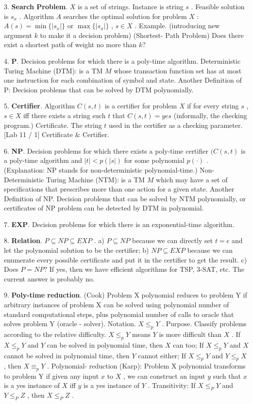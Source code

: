 \documentclass[10pt,a4paper]{article}
\begin{document}
3. \textbf{Search Problem}. \(X\) is a set of strings. Instance is string \(s\) . Feasible solution is \(s_{x}\) . Algorithm \(A\) searches the optimal solution for problem \(X\) : \(A(s) = \min \{|s_{x}|\}\) or \(\max \{|s_{x}|\}\) , \(s\in X\) .
Example. (introducing new argument \(k\) to make it a decision problem)
(Shortest- Path Problem) Does there exist a shortest path of weight no more than \(k?\)

4. \textbf{P}. Decision problems for which there is a poly-time algorithm.
Deterministic Turing Machine (DTM): is a TM \(M\) whose transaction function set has at most one instruction for each combination of symbol and state.
Another Definition of P: Decision problems that can be solved by DTM polynomially.

5. \textbf{Certifier}. Algorithm \(C(s,t)\) is a certifier for problem \(X\) if for every string \(s\) , \(s\in X\) iff there exists a string such \(t\) that \(C(s,t) = yes\) (informally, the checking program.)
Certificate. The string \(t\) used in the certifier as a checking parameter.
[Lab 11 / 1] Certificate \& Certifier.

6. \textbf{NP}. Decision problems for which there exists a poly-time certifier \((C(s,t)\) is a poly-time algorithm and \(|t|< p(|s|)\) for some polynomial \(p(\cdot)\) . (Explanation: NP stands for non-deterministic polynomial-time.)
Non-Deterministic Turing Machine (NTM): is a TM \(M\) which may have a set of specifications that prescribes more than one action for a given state.
Another Definition of NP. Decision problems that can be solved by NTM polynomially, or certificates of NP problem can be detected by DTM in polynomial.

7. \textbf{EXP}. Decision problems for which there is an exponential-time algorithm.

8. \textbf{Relation}. \(P\subseteq NP\subseteq EXP\) .
a) \(P\subseteq NP\) because we can directly set \(t = \epsilon\) and let the polynomial solution to be the certifier;
b) \(NP\subseteq EXP\) because we can enumerate every possible certificate and put it in the certifier to get the result.
c) Does \(P = NP?\) If yes, then we have efficient algorithms for TSP, 3-SAT, etc. The current answer is probably no.

9. \textbf{Poly-time reduction}. (Cook) Problem X polynomial reduces to problem Y if arbitrary instances of problem X can be solved using polynomial number of standard computational steps, plus polynomial number of calls to oracle that solves problem Y (oracle - solver).
Notation. \(X\leq_{p}Y\) .
Purpose. Classify problems according to the relative difficulty. \(X\leq_{p}Y\) means \(Y\) is more difficult than \(X\) .
If \(X\leq_{p}Y\) and \(Y\) can be solved in polynomial time, then \(X\) can too;
If \(X\leq_{p}Y\) and \(X\) cannot be solved in polynomial time, then \(Y\) cannot either;
If \(X\leq_{p}Y\) and \(Y\leq_{p}X\) , then \(X\equiv_{p}Y\) .
Polynomial- reduction (Karp): Problem X polynomial transforms to problem Y if given any input \(x\) to \(X\) , we can construct an input \(y\) such that \(x\) is a yes instance of \(X\) iff \(y\) is a yes instance of \(Y\) .
Transitivity: If \(X \leq_{P} Y\) and \(Y \leq_{P} Z\) , then \(X \leq_{P} Z\) .
\end{document}
